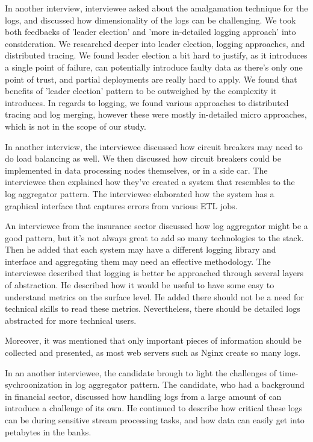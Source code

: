 \documentclass{bmcart}
\begin{document}
In another interview, interviewee asked about the amalgamation technique for the logs, and discussed how dimensionality of the logs can be challenging. We took both feedbacks of 'leader election' and 'more in-detailed logging approach' into consideration. We researched deeper into leader election, logging approaches, and distributed tracing. We found leader election a bit hard to justify, as it introduces a single point of failure, can potentially introduce faulty data as there's only one point of trust, and partial deployments are really hard to apply. We found that benefits of 'leader election' pattern to be outweighed by the complexity it introduces. In regards to logging, we found various approaches to distributed tracing and log merging, however these were mostly in-detailed micro approaches, which is not in the scope of our study. 

In another interview, the interviewee discussed how circuit breakers may need to do load balancing as well. We then discussed how circuit breakers could be implemented in data processing nodes themselves, or in a side car. The interviewee then explained how they've created a system that resembles to the log aggregator pattern. The interviewee elaborated how the system has a graphical interface that captures errors from various ETL jobs. 

An interviewee from the insurance sector discussed how log aggregator might be a good pattern, but it's not always great to add so many technologies to the stack. Then he added that each system may have a different logging library and interface and aggregating them may need an effective methodology. The interviewee described that logging is better be approached through several layers of abstraction. He described how it would be useful to have some easy to understand metrics on the surface level. He added there should not be a need for technical skills to read these metrics. Nevertheless, there should be detailed logs abstracted for more technical users.

Moreover, it was mentioned that only important pieces of information should be collected and presented, as most web servers such as Nginx create so many logs. 

In an another interviewee, the candidate brough to light the challenges of time-sychroonization in log aggregator pattern. The candidate, who had a background in financial sector, discussed how handling logs from a large amount of can introduce a challenge of its own. He continued to describe how critical these logs can be during sensitive stream processing tasks, and how data can easily get into petabytes in the banks. 
\end{document}
